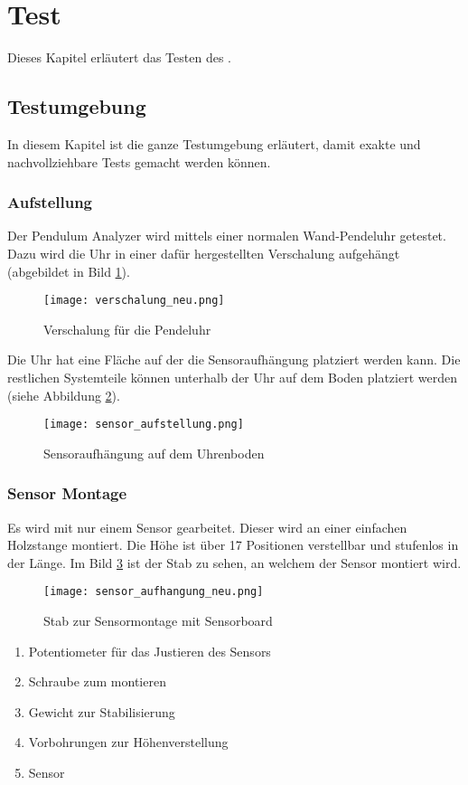 \section{Test}
Dieses Kapitel erläutert das Testen des \documenttitle.
	\subsection{Testumgebung}
    In diesem Kapitel ist die ganze Testumgebung erläutert, damit exakte und nachvollziehbare Tests gemacht werden können.
    \subsubsection{Aufstellung}
    Der Pendulum Analyzer wird mittels einer normalen Wand-Pendeluhr getestet. Dazu wird die Uhr in einer dafür hergestellten Verschalung aufgehängt (abgebildet in Bild \ref{fig:verschalung}).
    \begin{figure}[H]
        \centering
        \texttt{[image: verschalung\_neu.png]}
        \caption{Verschalung für die Pendeluhr}
        \label{fig:verschalung}
    \end{figure}

    \noindent Die Uhr hat eine Fläche auf der die Sensoraufhängung platziert werden kann.
    Die restlichen Systemteile können unterhalb der Uhr auf dem Boden platziert werden (siehe Abbildung \ref{fig:uhrboden}).
    \begin{figure}[h]
        \centering
        \texttt{[image: sensor\_aufstellung.png]}
        \caption{Sensoraufhängung auf dem Uhrenboden}
        \label{fig:uhrboden}
    \end{figure}
    
    \clearpage
    \subsubsection{Sensor Montage}
    Es wird mit nur einem Sensor gearbeitet.
    Dieser wird an einer einfachen Holzstange montiert.
    Die Höhe ist über 17 Positionen verstellbar und stufenlos in der Länge. Im Bild \ref{fig:sensor_montage} ist der Stab zu sehen, an welchem der Sensor montiert wird.
    \begin{figure}[H]
        \centering
        \texttt{[image: sensor\_aufhangung\_neu.png]}
        \caption{Stab zur Sensormontage mit Sensorboard}
        \label{fig:sensor_montage}
    \end{figure}
    \begin{enumerate}
        \item Potentiometer für das Justieren des Sensors
        \item Schraube zum montieren
        \item Gewicht zur Stabilisierung
        \item Vorbohrungen zur Höhenverstellung
        \item Sensor
    \end{enumerate}

